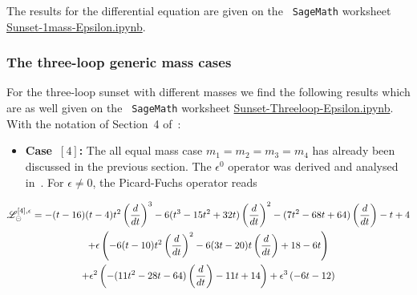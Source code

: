 \documentclass[a4paper,12pt]{article}
\numberwithin{equation}{section}
\numberwithin{figure}{section}
\def\su{\circleddash}
\begin{document}
The results for the differential equation are given on the {\tt
  SageMath} worksheet \href{Sunset-1mass-Epsilon.ipynb}{Sunset-1mass-Epsilon.ipynb}.



\subsubsection{The three-loop generic mass cases}\label{sec:threeloop}

For the three-loop sunset with different masses we find the following
results which are as well given on the  {\tt
  SageMath} worksheet \href{Sunset-Threeloop-Epsilon.ipynb}{Sunset-Threeloop-Epsilon.ipynb}. With the notation of Section~4 of~\cite{Lairez:2022zkj}:
%
\begin{itemize}
\item  {\bf Case~$[4]$:} The all equal mass case $m_1=m_2=m_3=m_4$ has already been
  discussed in the previous section. The $\epsilon^0$ operator was derived and analysed in~\cite{Vanhove:2014wqa,Bloch:2014qca,Pogel:2022yat}. For $ \epsilon \ne 0$, the Picard-Fuchs operator reads
   \end{itemize}
  \begin{multline}
    \mathscr{L}_\su^{[4],\epsilon}=
    -(t - 16)  (t - 4)  t^2\left(d\over dt\right)^3 - 6  (t^3 -
                              15  t^2 + 32  t)  \left(d\over dt\right)^2 - (7  t^2 - 68  t +
                              64)  \left(d\over dt\right) - t + 4\cr
                              +\epsilon \left(-6  (t - 10  ) t^2 \left(d\over dt\right)^2 -
      6  (3  t - 20  ) t \left(d\over dt\right) +18- 6  t 
      \right)\cr
    +\epsilon^2\left(-(11  t^2 -
      28  t - 64)  \left(d\over dt\right) - 11  t + 14\right)+ \epsilon^3\left(-6  t - 12\right)
  \end{multline}
\end{document}
